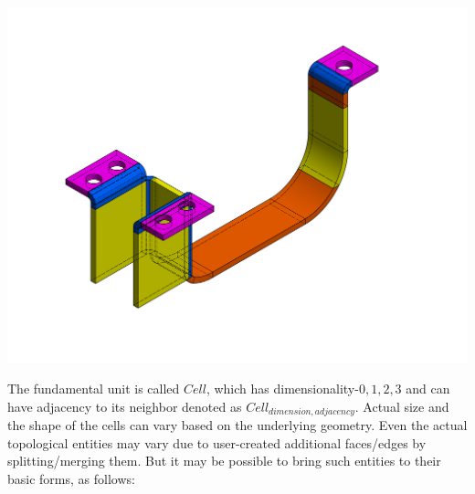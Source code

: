 \vspace{-0.8cm}
\begin{center}\includegraphics[width=0.6\linewidth]{../Common/images/VolDecomp1.pdf}\end{center}
\vspace{-1.2cm}
The  fundamental unit is called $Cell$, which has dimensionality-$0,1,2,3$ and can have adjacency to its neighbor denoted as $Cell_{dimension,adjacency}$. Actual size and the shape of the cells can vary based on the underlying geometry. Even the actual topological entities may vary due to user-created additional faces/edges by splitting/merging them. But it may be possible to bring such entities to their basic forms, as follows:

